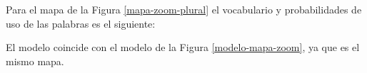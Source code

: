 Para el mapa de la Figura \ref{mapa-zoom-plural} el vocabulario y probabilidades de uso de las palabras es el siguiente:





El modelo coincide con el modelo de la Figura \ref{modelo-mapa-zoom}, ya que es el mismo mapa.


%
%

